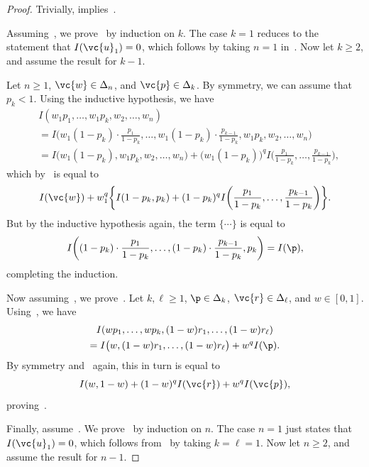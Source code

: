 \begin{proof}
% 

Trivially,  implies~.

Assuming~, we prove~ by induction on
$k$.  The case $k = 1$ reduces to the statement that $I(\vc{u}_1) = 0$,
which follows by taking $n = 1$ in~.  Now let $k \geq 2$,
and assume the result for $k - 1$.

Let $n \geq 1$, $\vc{w} \in \Delta_n$, and $\vc{p} \in \Delta_k$.  By
symmetry, we can assume that $p_k < 1$.  Using the inductive hypothesis, we
have
% 
\begin{align*}
&
I(w_1 p_1, \ldots, w_1 p_k, w_2, \ldots, w_n)   \\
&
=
I\biggl( 
w_1(1 - p_k) \cdot \frac{p_1}{1 - p_k}, \ldots,
w_1(1 - p_k) \cdot \frac{p_{k - 1}}{1 - p_k}, 
w_1 p_k, w_2, \ldots, w_n
\biggr) \\
&
=
I\bigl( w_1(1 - p_k), w_1 p_k, w_2, \ldots, w_n\bigr)
+
\bigl( w_1 (1 - p_k) \bigr)^q
I\biggl( \frac{p_1}{1 - p_k}, \ldots, \frac{p_{k - 1}}{1 - p_k} \biggr),
\end{align*}
% 
which by~ is equal to
\[
I(\vc{w}) 
+ 
w_1^q \biggl\{
I(1 - p_k, p_k) 
+
(1 - p_k)^q
I\biggl( \frac{p_1}{1 - p_k}, \ldots, \frac{p_{k - 1}}{1 - p_k} \biggr)
\biggr\}.
\]
But by the inductive hypothesis again, the term $\{\cdots\}$ is equal to
\[
I\biggl(
(1 - p_k) \cdot \frac{p_1}{1 - p_k}, \ldots, 
(1 - p_k) \cdot \frac{p_{k - 1}}{1 - p_k},
p_k
\biggr)
=
I(\p),
\]
completing the induction.

Now assuming~, we prove~.  Let $k,
\ell \geq 1$, $\p \in \Delta_k$, $\vc{r} \in \Delta_\ell$, and $w \in [0,
  1]$.  Using~, we have
% 
\begin{multline*}
I(wp_1, \ldots, wp_k, (1 - w)r_1, \ldots, (1 - w)r_\ell)        \\
=
I\bigl(w, (1 - w)r_1, \ldots, (1 - w)r_\ell\bigr)
+
w^q I(\p).
\end{multline*}
% 
By symmetry and~ again, this in turn is equal to 
\[
I(w, 1 - w) + (1 - w)^q I(\vc{r}) + w^q I(\vc{p}),
\]
proving~.

Finally, assume~. We prove~ by
induction on $n$.  The case $n = 1$ just states that $I(\vc{u}_1) = 0$,
which follows from~ by taking $k = \ell = 1$.  Now let
$n \geq 2$, and assume the result for $n - 1$.


\end{proof}
